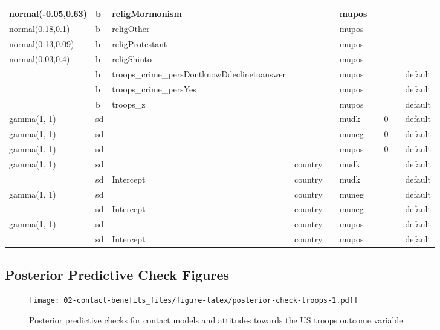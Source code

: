 \documentclass[
]{book}
\theoremstyle{definition}
\theoremstyle{definition}
\theoremstyle{definition}
\theoremstyle{definition}
\theoremstyle{remark}
\begin{document}
\begin{table}
\begin{tabular}[t]{l|l|l|l|l|l|l|l|l|l}
\hline
normal(-0.05,0.63) & b & religMormonism &  &  & mupos &  &  &  & \\
\hline
normal(0.18,0.1) & b & religOther &  &  & mupos &  &  &  & \\
\hline
normal(0.13,0.09) & b & religProtestant &  &  & mupos &  &  &  & \\
\hline
normal(0.03,0.4) & b & religShinto &  &  & mupos &  &  &  & \\
\hline
 & b & troops\_crime\_persDontknowDdeclinetoanswer &  &  & mupos &  &  &  & default\\
\hline
 & b & troops\_crime\_persYes &  &  & mupos &  &  &  & default\\
\hline
 & b & troops\_z &  &  & mupos &  &  &  & default\\
\hline
gamma(1, 1) & sd &  &  &  & mudk &  & 0 &  & default\\
\hline
gamma(1, 1) & sd &  &  &  & muneg &  & 0 &  & default\\
\hline
gamma(1, 1) & sd &  &  &  & mupos &  & 0 &  & default\\
\hline
gamma(1, 1) & sd &  & country &  & mudk &  &  &  & default\\
\hline
 & sd & Intercept & country &  & mudk &  &  &  & default\\
\hline
gamma(1, 1) & sd &  & country &  & muneg &  &  &  & default\\
\hline
 & sd & Intercept & country &  & muneg &  &  &  & default\\
\hline
gamma(1, 1) & sd &  & country &  & mupos &  &  &  & default\\
\hline
 & sd & Intercept & country &  & mupos &  &  &  & default\\
\hline
\end{tabular}
\end{table}

\hypertarget{posterior-predictive-check-figures}{%
\subsection{Posterior Predictive Check Figures}\label{posterior-predictive-check-figures}}

\begin{figure}
\centering
\texttt{[image: 02-contact-benefits\_files/figure-latex/posterior-check-troops-1.pdf]}
\caption{\label{fig:posterior-check-troops}Posterior predictive checks for contact models and attitudes towards the US troops outcome variable.}
\end{figure}
\end{document}
